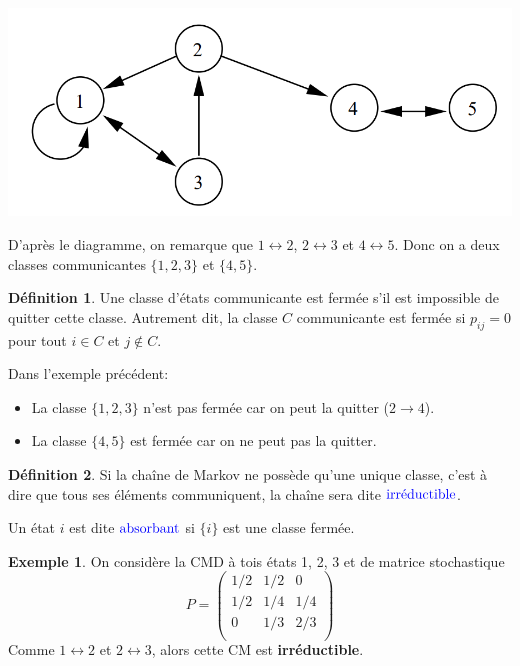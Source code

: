 \documentclass[
]{book}
\providecommand{\tightlist}{%
  \setlength{\itemsep}{0pt}\setlength{\parskip}{0pt}}
\theoremstyle{definition}
\newtheorem{definition}{Définition}[chapter]
\theoremstyle{definition}
\newtheorem{example}{Exemple}[chapter]
\theoremstyle{definition}
\theoremstyle{remark}
\begin{document}
\begin{center}\includegraphics[width=0.5\linewidth]{images/graph2} \end{center}

D'après le diagramme, on remarque que \(1 \longleftrightarrow 2\), \(2 \longleftrightarrow 3\) et \(4 \longleftrightarrow 5\). Donc on a deux classes communicantes \(\{1,2,3\}\) et \(\{4,5 \}\).

\begin{definition}
\protect\hypertarget{def:unnamed-chunk-63}{}{\label{def:unnamed-chunk-63} }Une classe d'états communicante est fermée s'il est impossible de quitter
cette classe. Autrement dit, la classe \(C\) communicante est fermée si \(p_{ij} = 0\) pour tout \(i \in C\) et \(j \notin C\).
\end{definition}

Dans l'exemple précédent:

\begin{itemize}
\tightlist
\item
  La classe \(\{1,2,3\}\) n'est pas fermée car on peut la quitter (\(2 \longrightarrow 4\)).
\item
  La classe \(\{4,5\}\) est fermée car on ne peut pas la quitter.
\end{itemize}

\begin{definition}
\protect\hypertarget{def:unnamed-chunk-64}{}{\label{def:unnamed-chunk-64} }Si la chaîne de Markov ne possède qu'une unique classe, c'est à dire que tous
ses éléments communiquent, la chaîne sera dite \(\color{blue}{\mathbf{\text{irréductible}}}\).

Un état \(i\) est dite \(\color{blue}{\mathbf{\text{absorbant}}}\) si \(\{i\}\) est une classe fermée.
\end{definition}

\begin{example}
\protect\hypertarget{exm:unnamed-chunk-65}{}{\label{exm:unnamed-chunk-65} }On considère la CMD à tois états 1, 2, 3 et de matrice stochastique
\[
  P=\left( 
    \begin{array}{ccc}
    1/2 & 1/2 & 0 \\
    1/2 & 1/4 & 1/4 \\
    0 & 1/3 & 2/3\\
    \end{array}
    \right)
\]
Comme \(1 \longleftrightarrow 2\) et \(2 \longleftrightarrow 3\), alors cette CM est \textbf{irréductible}.
\end{example}
\end{document}
